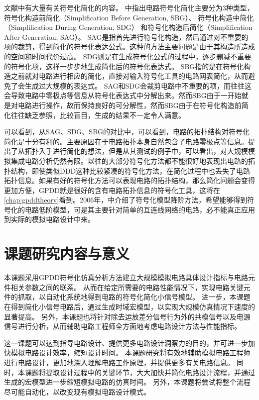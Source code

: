 文献中有大量有关符号化简化的内容。
\parencite{Gielen-Review-2002}中指出电路符号化简化主要分为3种类型，
符号化构造前简化（Simplification Before Generation, SBG）\parencite{Hsu-SBG-1994}、
符号化构造中简化（Simplification During Generation, SDG）\parencite{Fern-SDG-1994}
和符号化构造后简化（Simplification After Generation, SAG）\parencite{Gielen-ISAAC-1989,Sheldon-DDDSimp-1999}。
SAG是指首先进行符号化构造，然后通过对不重要的项的裁剪，得到简化的符号化表达公式。这种的方法主要问题是由于其构造所造成的空间和时间代价过高。
SDG则是在生成符号化公式的过程中，逐步删减不重要的符号化项，这样一步步地生成简化后的符号化表达式。
SBG指的是在符号化构造之前就对电路进行相应的简化，直接对输入符号化工具的电路网表简化，从而避免了会生成过大规模的表达式。
SAG和SDG会裁剪电路中不重要的项，而往往这会导致电路中零极点等信息从符号化表达式中分解出来。然而SBG由于一开始就是对电路进行操作，故而保持良好的可分解性，然而SBG由于在符号化构造前简化往往缺乏参照，比较盲目，生成的结果不一定令人满意。

可以看到，从SAG、SDG、SBG的对比中，可以看到，电路的拓扑结构对符号化简化是十分有利的。主要原因在于电路拓扑本身自然包含了电路零极点等信息。\parencite{Zivkovic-TopoSimp-1995}提出了从拓扑入手进行简化的想法，但是从其测试的例子中，可以看出，对大规模模拟集成电路分析仍然有限。以往的大部分符号化方法都不能很好地表现出电路的拓扑结构，即使类似DDD这种比较紧凑的符号化方法，在简化过程中也丢失了电路拓扑信息。如果有好的符号化方法可以表现电路的拓扑结构，那么简化问题会变得更加方便，GPDD就是很好的含有电路拓扑信息的符号化工具，这将在\ref{chap:gpddtheory}看到。2006年，\parencite{GShi-SMOR-2006}中介绍了符号化模型降阶方法，希望能够得到符号化的电路低阶模型，可是其主要针对简单的互连线网络的电路，必不能真正应用到实际的模拟电路设计中来。

\section{课题研究内容与意义}
\label{sec:intro:meaning}

本课题采用GPDD符号化仿真分析方法建立大规模模拟电路具体设计指标与电路元件相关参数之间的联系。
从而在给定所需要的电路性能情况下，实现电路关键元件的抓取，以自动化系统地得到电路的符号化简化小信号模型。
进一步，本课题在得到简化小信号电路后，通过生成时域宏模型，以实现大规模仿真情况下速度的显著提高。
另外，本课题也将针对除去运放差分信号行为外的共模信号以及电源信号进行分析，从而辅助电路工程师全方面地考虑电路设计方法与性能指标。

这一课题可以达到指导电路设计、提供更多电路设计洞察力的目的，并可进一步加快模拟电路设计效率，缩短设计时间。
本课题研究将有效地辅助模拟电路工程师进行电路设计，更加地深入理解电路工作原理，并提供更多有关电路信息。
同时，本课题将提取设计过程中的关键环节，大大加快并简化电路设计流程，并通过生成的宏模型进一步缩短模拟电路的仿真时间。
另外，本课题将尝试将整个流程尽可能自动化，以改变现有模拟电路设计模式。

